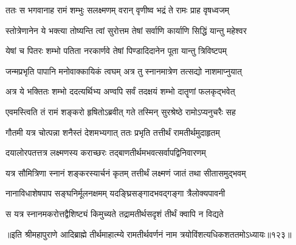 

\twolineshloka
{ततः स भगवानाह रामं शम्भुः सलक्ष्मणम्}
{वरान् वृणीष्व भद्रं ते रामः प्राह वृषध्वजम्} %



\twolineshloka
{स्तोत्रेणानेन ये भक्त्या तोष्यन्ति त्वां सुरोत्तम}
{तेषां सर्वाणि कार्याणि सिद्धिं यान्तु महेश्वर} %

\twolineshloka
{येषां च पितरः शम्भो पतिता नरकार्णवे}
{तेषां पिण्डादिदानेन पूता यान्तु त्रिविष्टपम्} %

\twolineshloka
{जन्मप्रभृति पापानि मनोवाक्कायिकं त्वघम्}
{अत्र तु स्नानमात्रेण तत्सद्यो नाशमाप्नुयात्} %

\twolineshloka
{अत्र ये भक्तितः शम्भो ददत्यर्थिभ्य अण्वपि}
{सर्वं तदक्षयं शम्भो दातॄणां फलकृद्भवेत्} %



\twolineshloka
{एवमस्त्विति तं रामं शङ्करो हृषितोऽब्रवीत्}
{गते तस्मिन् सुरश्रेष्ठे रामोऽप्यनुचरैः सह} %

\twolineshloka
{गौतमी यत्र चोत्पन्ना शनैस्तं देशमभ्यगात्}
{ततः प्रभृति तत्तीर्थं रामतीर्थमुदाहृतम्} %

\twolineshloka
{दयालोरपतत्तत्र लक्ष्मणस्य कराच्छरः}
{तद्बाणतीर्थमभवत्सर्वापद्विनिवारणम्} %

\twolineshloka
{यत्र सौमित्रिणा स्नानं शङ्करस्यार्चनं कृतम्}
{तत्तीर्थं लक्ष्मणं जातं तथा सीतासमुद्भवम्} %

\twolineshloka
{नानाविधाशेषपाप सङ्घनिर्मूलनक्षमम्}
{यदङ्घ्रिसङ्गादभवद्गङ्गा त्रैलोक्यपावनी} %

\twolineshloka
{स यत्र स्नानमकरोत्तद्वैशिष्ट्यं किमुच्यते}
{तद्रामतीर्थसदृशं तीर्थं क्वापि न विद्यते} %

॥इति श्रीमहापुराणे आदिब्राह्मे तीर्थमाहात्म्ये रामतीर्थवर्णनं नाम त्रयोविंशत्यधिकशततमोऽध्यायः॥१२३॥
